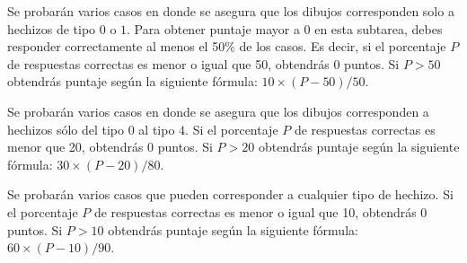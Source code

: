 \documentclass{oci}
\begin{document}
\begin{description}[leftmargin=0pt]
  \itemsep 0pt
   Se probarán varios casos en donde se asegura que los dibujos
  corresponden solo a hechizos de tipo $0$ o $1$.
  Para obtener puntaje mayor a $0$ en esta subtarea, debes responder
  correctamente al menos el 50\% de los casos.
  Es decir, si el porcentaje $P$ de respuestas correctas es menor o igual que 50,
  obtendrás 0 puntos.
  Si $P > 50$ obtendrás puntaje según la siguiente fórmula: $10\times(P-50)/50$.
   
   Se probarán varios casos en donde se asegura que los dibujos
  corresponden a hechizos sólo del tipo $0$ al tipo $4$.
  Si el porcentaje $P$ de respuestas correctas es menor que 20, obtendrás 0 puntos.
  Si $P > 20$ obtendrás puntaje según la siguiente fórmula: $30\times(P-20)/80$.
  
   Se probarán varios casos que pueden corresponder a cualquier tipo
  de hechizo.
  Si el porcentaje $P$ de respuestas correctas es menor o igual que 10, obtendrás
  0 puntos.
  Si $P > 10$ obtendrás puntaje según la siguiente fórmula: $60\times(P-10)/90$.
\end{description}
\end{document}
